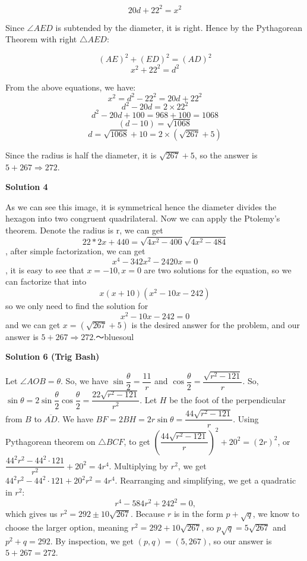 \begin{enumerate}
 
 \[20d + 22^2 = x^2\]

 Since $\angle AED$ is subtended by the diameter, it is right. Hence by the Pythagorean Theorem with right $\triangle AED$:

 
 \[(AE)^2 + (ED)^2 = (AD)^2\]
 \[x^2 + 22^2 = d^2\]

 From the above equations, we have:
 \[x^2 = d^2 - 22^2 = 20d + 22^2\]
 \[d^2 - 20d = 2\times22^2\]
 \[d^2 - 20d + 100 = 968+100 = 1068\]
 \[(d-10) = \sqrt{1068}\]
 \[d = \sqrt{1068} + 10 = 2\times(\sqrt{267}+5)\]

 Since the radius is half the diameter, it is $\sqrt{267}+5$, so the answer is $5+267 \Rightarrow \boxed{272}$.

 



\textbf{Solution 4}

As we can see this image, it is symmetrical hence the diameter divides the hexagon into two congruent quadrilateral. Now we can apply the Ptolemy's theorem. Denote the radius is r, we can get 
 \[22*2x+440=\sqrt{4x^2-400}\sqrt{4x^2-484}\], after simple factorization, we can get 
 \[x^4-342x^2-2420x=0\], it is easy to see that $x=-10, x=0$ are two solutions for the equation, so we can factorize that into 
 \[x(x+10)(x^2-10x-242)\]so we only need to find the solution for 
 \[x^2-10x-242=0\] and we can get $x=(\sqrt{267}+5)$ is the desired answer for the problem, and our answer is $5+267 \Rightarrow \boxed{272}$.～bluesoul

 



\textbf{Solution 6 (Trig Bash)}

Let $\angle{AOB} = \theta$. So, we have $\sin \dfrac{\theta}{2} = \dfrac{11}{r}$ and $\cos \dfrac{\theta}{2} = \dfrac{\sqrt{r^{2} - 121}}{r}$. So, $\sin \theta = 2 \sin \dfrac{\theta}{2} \cos \dfrac{\theta}{2} = \dfrac{22 \sqrt{r^{2} - 121}}{r^{2}}$. Let $H$ be the foot of the perpendicular from $B$ to $\overline{AD}$. We have $BF = 2 BH = 2 r \sin \theta = \dfrac{44 \sqrt{r^{2} - 121}}{r}$. Using Pythagorean theorem on $\triangle BCF$, to get $(\dfrac{44 \sqrt{r^{2} - 121}}{r})^{2} + 20^{2} = (2r)^{2}$, or $\dfrac{44^{2}r^{2} - 44^{2} \cdot 121}{r^{2}} + 20^{2} = 4r^{4}$. Multiplying by $r^{2}$, we get $44^{2} r^{2} - 44^{2} \cdot 121 + 20^{2} r^{2} = 4r^{4}$. Rearranging and simplifying, we get a quadratic in $r^{2}$: 
 \[r^{4} - 584r^{2} + 242^{2} = 0 \text{,}\] which gives us $r^{2} = 292 \pm 10\sqrt{267}$. Because $r$ is in the form $p + \sqrt{q}$, we know to choose the larger option, meaning $r^2 = 292 + 10\sqrt{267}$, so $p\sqrt{q} = 5\sqrt{267}$ and $p^2 + q = 292$. By inspection, we get $(p, q) = (5, 267)$, so our answer is $5 + 267 = \boxed{272}$.


\end{enumerate}
